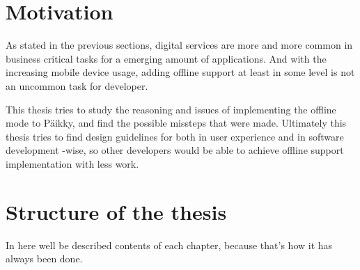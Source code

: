 \section{Motivation}
As stated in the previous sections, digital services are more and more common in business critical tasks for a emerging amount of applications. And with the increasing mobile device usage, adding offline support at least in some level is not an uncommon task for developer. 

This thesis tries to study the reasoning and issues of implementing the offline mode to Päikky, and find the possible missteps that were made. Ultimately this thesis tries to find design guidelines for both in user experience and in software development -wise, so other developers would be able to achieve offline support implementation with less work.




\section{Structure of the thesis}
In here well be described contents of each chapter, because that's how it has always been done.


















